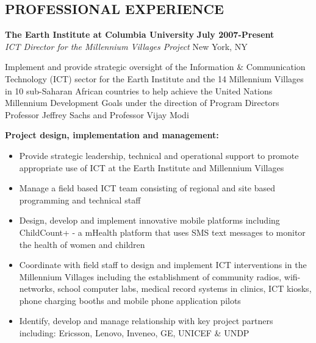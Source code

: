 \documentclass{res}
\begin{document}
\thispagestyle{empty} %

\address{ 501 W. 156th St \#65 \\   New York, NY 10032 \\ +1.646.463.1273}      
                                      
\address{mlberg@gmail.com \\ mberg@buildafrica.org \\ http://www.buildafrica.org }

\begin{resume}
 
\section{PROFESSIONAL EXPERIENCE} 
\vspace{8pt}
\textbf{The Earth Institute at Columbia University} \hfill        \textbf{July 2007-Present} \\
\emph{ICT Director for the Millennium Villages Project}       \hfill   New York, NY

Implement and provide strategic oversight of the Information \& Communication Technology (ICT) sector for the Earth Institute and the 14 Millennium Villages in 10 sub-Saharan African countries to help achieve the United Nations Millennium Development Goals under the direction of Program Directors Professor Jeffrey Sachs and Professor Vijay Modi 

\textbf{Project design, implementation and management: }
\begin{itemize} \itemsep -2pt %
	\item Provide strategic leadership, technical and operational support to promote appropriate use of ICT at the Earth Institute and Millennium Villages
	\item Manage a field based ICT team consisting of regional and site based programming and technical staff
	\item Design, develop and implement innovative mobile platforms including ChildCount+ - a mHealth platform that uses SMS text messages to monitor the health of women and children
	\item Coordinate with field staff to design and implement ICT interventions in the Millennium Villages including the establishment of community radios, wifi-networks, school computer labs, medical record systems in clinics, ICT kiosks, phone charging booths and mobile phone application pilots
	\item Identify, develop and manage relationship with key project partners including: Ericsson, Lenovo, Inveneo, GE, UNICEF \& UNDP
 \end{itemize} \vspace{-4pt}


\end{resume}
\end{document}
